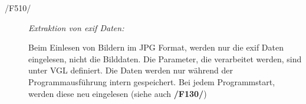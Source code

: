 	\begin{description}

		\item[/F510/] \textit{Extraktion von \gls{exif} Daten:}\par Beim Einlesen von Bildern im JPG Format, werden nur die \gls{exif} Daten eingelesen, nicht die Bilddaten. Die Parameter, die verarbeitet werden, sind unter VGL definiert. Die Daten werden nur während der Programmausführung intern gespeichert. Bei jedem Programmstart, werden diese neu eingelesen (siehe auch \textbf{/F130/})
	
	\end{description}